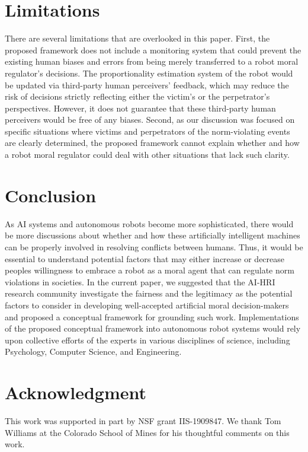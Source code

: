 \documentclass{article} %
\begin{document}
\section{Limitations}
There are several limitations that are overlooked in this paper. First, the proposed framework does not include a monitoring system that could prevent the existing human biases and errors \cite{o2016weapons,sourdin2018judge} from being merely transferred to a robot moral regulator's decisions. The proportionality estimation system of the robot would be updated via third-party human perceivers' feedback, which may reduce the risk of decisions strictly reflecting either the victim's or the perpetrator's perspectives. However, it does not guarantee that these third-party human perceivers would be free of any biases. Second, as our discussion was focused on specific situations where victims and perpetrators of the norm-violating events are clearly determined, the proposed framework cannot explain whether and how a robot moral regulator could deal with other situations that lack such clarity.

\section{Conclusion}
As AI systems and autonomous robots become more sophisticated, there would be more discussions about whether and how these artificially intelligent machines can be properly involved in resolving conflicts between humans. Thus, it would be essential to understand potential factors that may either increase or decrease peoples willingness to embrace a robot as a moral agent that can regulate norm violations in societies. In the current paper, we suggested that the AI-HRI research community investigate the fairness and the legitimacy as the potential factors to consider in developing well-accepted artificial moral decision-makers and proposed a conceptual framework for grounding such work. Implementations of the proposed conceptual framework into autonomous robot systems would rely upon collective efforts of the experts in various disciplines of science, including Psychology, Computer Science, and Engineering.

\section{Acknowledgment}
This work was supported in part by NSF grant IIS-1909847. We thank Tom Williams at the Colorado School of Mines for his thoughtful comments on this work.
\end{document}
